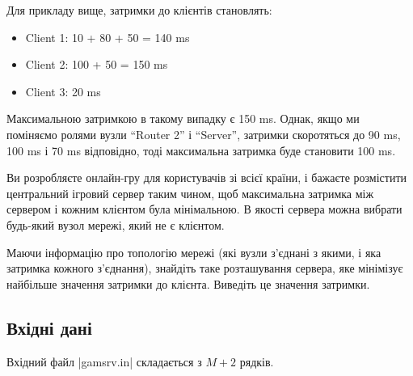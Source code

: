 \documentclass[12pt,a4paper]{article}
\begin{document}
Для прикладу вище, затримки до клієнтів становлять:
\begin{itemize}
    \item Client 1: 10 + 80 + 50 = 140 ms
    \item Client 2: 100 + 50 = 150 ms
    \item Client 3: 20 ms
\end{itemize}

Максимальною затримкою в такому випадку є 150 ms. Однак, якщо ми поміняємо ролями вузли ``Router 2'' і ``Server'', затримки скоротяться до 90 ms, 100 ms і 70 ms відповідно, тоді максимальна затримка буде становити 100 ms.

\begin{center}
    \footnotesize
\end{center}


Ви розробляєте онлайн-гру для користувачів зі всієї країни, і бажаєте розмістити центральний ігровий сервер таким чином, щоб максимальна затримка між сервером і кожним клієнтом була мінімальною. В якості сервера можна вибрати будь-який вузол мережі, який не є клієнтом.

Маючи інформацію про топологію мережі (які вузли з’єднані з якими, і яка затримка кожного з’єднання), знайдіть таке розташування сервера, яке мінімізує найбільше значення затримки до клієнта. Виведіть це значення затримки.


\subsection*{Вхідні дані}

Вхідний файл |gamsrv.in| складається з \(M + 2\) рядків.
\end{document}
